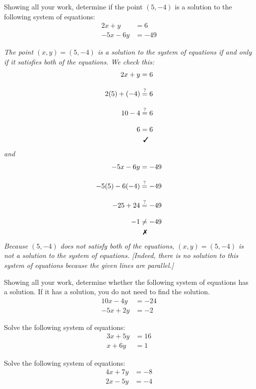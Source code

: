 \documentclass[12pt,letterpaper]{exam}
\begin{document}
\begin{questions}
\newpage
\question[10] Showing all your work, determine if the point $(5, -4)$ is a solution to the following system of equations:
	\[
	\begin{aligned}
	2x + y&= 6 \\[0.3cm]
	-5x - 6y&= -49
	\end{aligned}
	\] \pspace

{\itshape The point $(x, y)= (5, -4)$ is a solution to the system of equations if and only if it satisfies both of the equations. We check this:
	\[
	\begin{aligned}
	2x + y&= 6 \\[0.3cm]
	2(5) + (-4)&\stackrel{?}{=} 6 \\[0.3cm]
	10 - 4&\stackrel{?}{=} 6 \\[0.3cm]
	6&= 6 \\
	&\;\,\text{\cmark}
	\end{aligned}
	\]
and
	\[
	\begin{aligned}
	-5x - 6y&= -49 \\[0.3cm]
	-5(5) - 6(-4)&\stackrel{?}{=} -49 \\[0.3cm]
	-25 + 24&\stackrel{?}{=} -49 \\[0.3cm]
	-1&\neq -49 \\
	&\;\,\text{\xmark}
	\end{aligned}
	\] \pspace
Because $(5, -4)$ does not satisfy both of the equations, $(x, y)= (5, -4)$ is not a solution to the system of equations. [Indeed, there is no solution to this system of equations because the given lines are parallel.]
}



\newpage
\question[10] Showing all your work, determine whether the following system of equations has a solution. If it has a solution, you do not need to find the solution.
	\[
	\begin{aligned}
	10x - 4y&= -24 \\[0.3cm]
	-5x + 2y&= -2
	\end{aligned}
	\]



\newpage
\question[10] Solve the following system of equations:
	\[
	\begin{aligned}
	3x + 5y&= 16 \\[0.3cm]
	x + 6y&= 1
	\end{aligned}
	\]



\newpage
\question[10] Solve the following system of equations:
	\[
	\begin{aligned}
	4x + 7y&= -8 \\[0.3cm]
	2x - 5y&= -4
	\end{aligned}
	\]




\end{questions}
\end{document}
